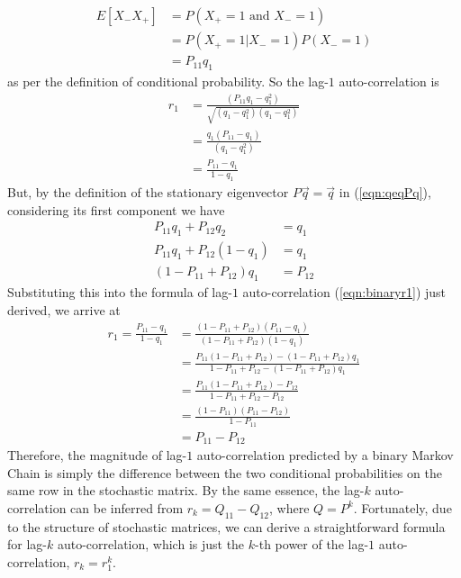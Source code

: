 \begin{align}
E[X_{-}X_{+}] &= P(X_{+}=1 \text{ and } X_{-}=1) \nonumber \\
&= P(X_{+}=1|X_{-}=1) P(X_{-}=1) \nonumber \\
&= P_{11} q_1
\end{align}
as per the definition of conditional probability. So the lag-$1$ auto-correlation is
\begin{align}
r_1 &= \frac{(P_{11}q_1-q_1^2)}{\sqrt{(q_1-q_1^2)(q_1-q_1^2)}} \nonumber \\
&= \frac{q_1(P_{11}-q_1)}{(q_1-q_1^2)} \nonumber \\
&= \frac{P_{11}-q_1}{1-q_1} \label{eqn:binaryr1}
\end{align}
But, by the definition of the stationary eigenvector $P\vec{q} = \vec{q}$ in (\ref{eqn:qeqPq}), considering its first component we have
\begin{align}
P_{11}q_1 + P_{12}q_2 &= q_1  \nonumber \\
P_{11}q_1 + P_{12}(1-q_1) &= q_1 \nonumber  \\
(1 - P_{11} + P_{12}) q_1 &= P_{12}
\end{align}
Substituting this into the formula of lag-$1$ auto-correlation (\ref{eqn:binaryr1}) just derived, we arrive at
\begin{align}
r_1 = \frac{P_{11}-q_1}{1-q_1} &= \frac{(1 - P_{11} + P_{12})(P_{11}-q_1)}{(1 - P_{11} + P_{12})(1-q_1)}  \nonumber \\
&= \frac{P_{11}(1 - P_{11} + P_{12}) - (1 - P_{11} + P_{12})q_1}{1 - P_{11} + P_{12} - (1 - P_{11} + P_{12})q_1}  \nonumber \\
&= \frac{P_{11}(1 - P_{11} + P_{12}) - P_{12}}{1 - P_{11} + P_{12} - P_{12}} \nonumber  \\
&= \frac{(1-P_{11})(P_{11}-P_{12})}{1 - P_{11}} \nonumber  \\
&= P_{11} - P_{12}
\end{align}
Therefore, the magnitude of lag-$1$ auto-correlation predicted by a binary Markov Chain is simply the difference between the two conditional probabilities on the same row in the stochastic matrix. By the same essence, the lag-$k$ auto-correlation can be inferred from $r_k = Q_{11} - Q_{12}$, where $Q = P^k$. Fortunately, due to the structure of stochastic matrices, we can derive a straightforward formula for lag-$k$ auto-correlation, which is just the $k$-th power of the lag-$1$ auto-correlation, $r_k = r_1^k$.

